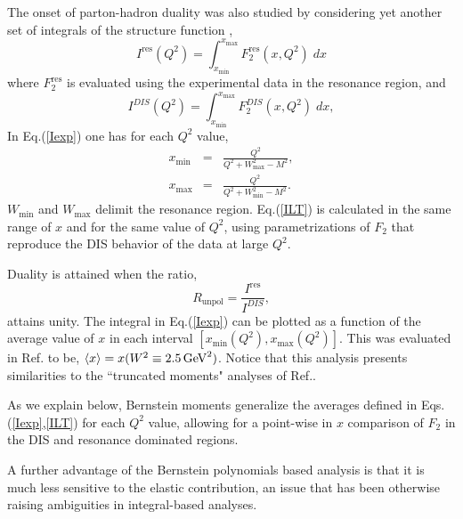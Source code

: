 \documentclass[
twocolumn,
aps,prd,
nofootinbib,
superscriptaddress,
showpacs,ligh
tightenlines, 
]{revtex4}
\begin{document}
The onset of parton-hadron duality was also studied 
by considering yet another set of integrals of the structure function \cite{Liuti:2001qk,Bianchi:2003hi},
\begin{equation}
\label{Iexp}
I^{\mathrm{res}}(Q^2) = \int^{x_{\mathrm{max}}}_{x_{\mathrm{min}}} 
F_2^{\mathrm{res}}(x,Q^2) \; dx
\end{equation}
where $F_2^{\mathrm{res}}$ is evaluated using the experimental data  
in the resonance region, and
\begin{equation}
I^{DIS}(Q^2) = \int^{x_{\mathrm{max}}}_{x_{\mathrm{min}}} F_2^{DIS}(x,Q^2) \; dx,
\label{ILT}
\end{equation}
In Eq.(\ref{Iexp}) one has for each $Q^2$ value,
\begin{subequations}
\label{eq:xminmax}
\begin{eqnarray}
x_{\mathrm{min}} & = & \frac{Q^2}{Q^2+W_{\mathrm{max}}^2-M^2}, \\
x_{\mathrm{max}} & = & \frac{Q^2}{Q^2+W_{\mathrm{min}}^2-M^2} .
\end{eqnarray}
\end{subequations}
$W_{\mathrm{min}}$  and $W_{\mathrm{max}}$ delimit the resonance region. 
Eq.(\ref{ILT}) is calculated in the same range of 
$x$ and for the same value of $Q^2$, using parametrizations 
of $F_2$ that reproduce the DIS behavior
of the data at large $Q^2$.

Duality is attained when the ratio,
\begin{equation}
R_{\mathrm{unpol}} = \frac{I^{\mathrm{res}}}{I^{DIS}},
\label{RdualLT}
\end{equation}
attains unity. 
The integral in Eq.(\ref{Iexp}) can be plotted as a function of the average value of $x$ in each interval 
$[x_{\mathrm{min}}(Q^2), x_{\mathrm{max}}(Q^2)]$. This 
was evaluated in Ref.\cite{Bianchi:2003hi} to be, $\langle x \rangle = x(W^2 \equiv 2.5 \, \rm{GeV}^2)$. 
Notice that this analysis presents similarities to the ``truncated moments" analyses of Ref.\cite{Psaker:2008ju}.  

As we explain below, Bernstein moments generalize the averages defined in Eqs.(\ref{Iexp},\ref{ILT}) 
for each $Q^2$ value, allowing for a point-wise in $x$ comparison of $F_2$ in the DIS and resonance dominated 
regions. 

A further advantage of the Bernstein polynomials based analysis is that it is much less sensitive to the elastic contribution, an issue that has been otherwise raising ambiguities in integral-based analyses.  
\end{document}

